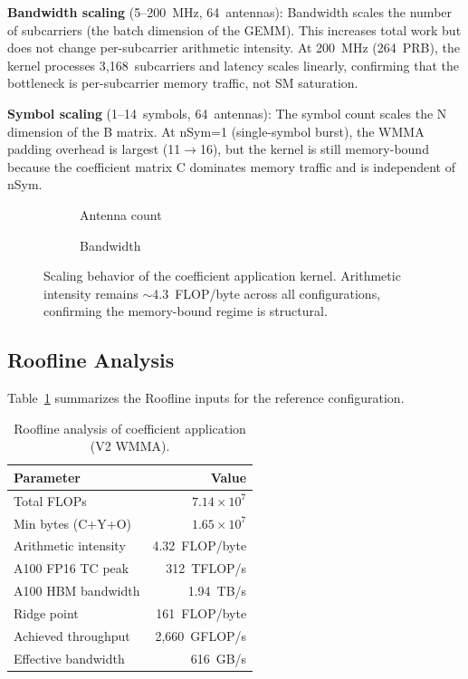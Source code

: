 \textbf{Bandwidth scaling} (5--200~MHz, 64~antennas): Bandwidth scales the number of subcarriers (the batch dimension of the GEMM). This increases total work but does not change per-subcarrier arithmetic intensity. At 200~MHz (264~PRB), the kernel processes 3,168~subcarriers and latency scales linearly, confirming that the bottleneck is per-subcarrier memory traffic, not SM saturation.

\textbf{Symbol scaling} (1--14~symbols, 64~antennas): The symbol count scales the N dimension of the B matrix. At nSym=1 (single-symbol burst), the WMMA padding overhead is largest (11$\rightarrow$16), but the kernel is still memory-bound because the coefficient matrix C dominates memory traffic and is independent of nSym.

\begin{figure}[h]
\centering
\begin{subfigure}{0.48\columnwidth}
\centering
{}
\caption{Antenna count}
\end{subfigure}
\begin{subfigure}{0.48\columnwidth}
\centering
{}
\caption{Bandwidth}
\end{subfigure}
\caption{Scaling behavior of the coefficient application kernel. Arithmetic intensity remains $\sim$4.3~FLOP/byte across all configurations, confirming the memory-bound regime is structural.}
\label{fig:scaling}
\end{figure}

\subsection{Roofline Analysis}

Table~\ref{tab:roofline} summarizes the Roofline inputs for the reference configuration.

\begin{table}[h]
\centering
\small
\caption{Roofline analysis of coefficient application (V2 WMMA).}
\label{tab:roofline}
\begin{tabular}{lr}
\toprule
Parameter & Value \\
\midrule
Total FLOPs & $7.14 \times 10^7$ \\
Min bytes (C+Y+O) & $1.65 \times 10^7$ \\
Arithmetic intensity & 4.32~FLOP/byte \\
A100 FP16 TC peak & 312~TFLOP/s \\
A100 HBM bandwidth & 1.94~TB/s \\
Ridge point & 161~FLOP/byte \\
Achieved throughput & 2,660~GFLOP/s \\
Effective bandwidth & 616~GB/s \\
\bottomrule
\end{tabular}
\end{table}

